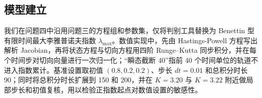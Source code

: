 \subsection{模型建立}
我们在问题四中沿用问题三的方程组和参数集，仅将判别工具替换为 Benettin 型有限时间最大李雅普诺夫指数 $\lambda_{\max}$。数值实现中，先由 Hastings-Powell 方程写出解析 Jacobian，再将状态方程与切向方程用四阶 Runge--Kutta 同步积分，并在每个时间步对切向向量进行一次归一化；“瞬态截断 40”指前 40 个时间单位的轨道不进入指数累计。基准设置取初值 $(0.8,0.2,0.2)$、步长 $dt=0.01$ 和总积分时长 90；同时将总积分时长扩展到 150 和 200，并在 $K=3.20$ 与 $K=3.22$ 附近做局部步长和初值复核，用以检验正指数起点对数值设置的敏感性。

